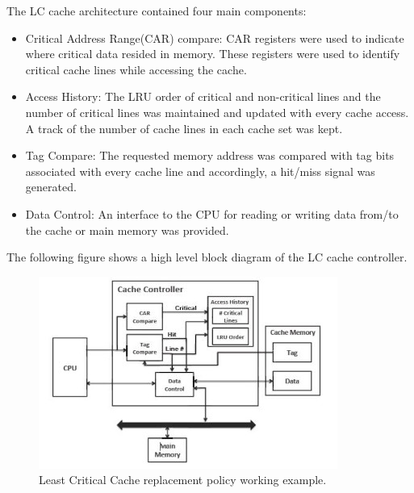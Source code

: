 \documentclass[conference]{IEEEtran}
\begin{document}
    The LC cache architecture contained four main components:
    \begin{itemize}
        \item Critical Address Range(CAR) compare: CAR registers were used to indicate where critical data resided in memory. These registers were used to identify critical cache lines while accessing the cache.
        \item Access History: The LRU order of critical and non-critical lines and the number of critical lines was maintained and updated with every cache access. A track of the number of cache lines in each cache set was kept.
        \item Tag Compare: The requested memory address was compared with tag bits associated with every cache line and accordingly, a hit/miss signal was generated.
        \item Data Control: An interface to the CPU for reading or writing data from/to the cache or main memory was provided.
    \end{itemize}
    The following figure shows a high level block diagram of the LC cache controller.
    \begin{figure}[htbp]
        \centerline{\includegraphics{LCblockDiag.jpg}}
        \caption{Least Critical Cache replacement policy working example.\cite{b4}}
        \label{fig_d_2}
    \end{figure}
\end{document}
